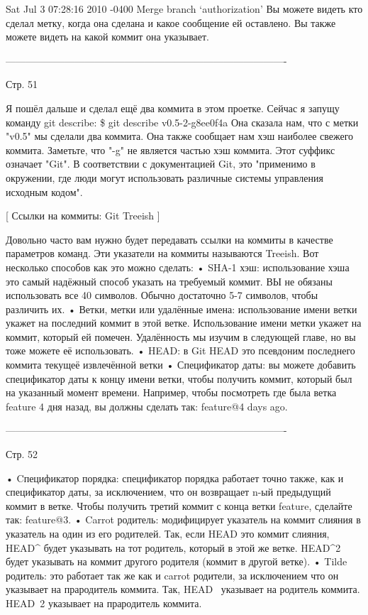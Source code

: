 Sat Jul 3 07:28:16 2010 -0400
Merge branch ‘authorization’
Вы можете видеть кто сделал метку, когда она сделана и какое сообщение ей оставлено.
Вы также можете видеть на какой коммит она указывает.

-------------------------------------------------------------------------------------

Стр. 51

Я пошёл дальше и сделал ещё два коммита в этом проетке. Сейчас я запущу команду
git describe:
\$ git describe
v0.5-2-g8ee0f4a
Она сказала нам, что с метки "v0.5" мы сделали два коммита. Она также сообщает
нам хэш наиболее свежего коммита. Заметьте, что "-g" не является частью хэш коммита.
Этот суффикс означает "Git". В соответствии с документацией Git, это "применимо в 
окружении, где люди могут использовать различные системы управления исходным кодом".

[ Ссылки на коммиты: Git Treeish ]

Довольно часто вам нужно будет передавать ссылки на коммиты в качестве параметров
команд. Эти указатели на коммиты называются Treeish.
Вот несколько способов как это можно сделать:
        • SHA-1 хэш: использование хэша это самый надёжный способ указать на требуемый
        коммит. ВЫ не обязаны использовать все 40 символов. Обычно достаточно 5-7
        символов, чтобы различить их.
        • Ветки, метки или удалённые имена: использование имени ветки укажет на 
        последний коммит в этой ветке. Использование имени метки укажет на коммит,
        который ей помечен. Удалённость мы изучим в следующей главе, но вы тоже 
        можете её использовать.
        • HEAD: в Git HEAD это псевдоним последнего коммита текущеё извлечённой 
        ветки
        • Спецификатор даты: вы можете добавить спецификатор даты к концу имени ветки,
        чтобы получить коммит, который был на указанный момент времени. Например,
        чтобы посмотреть где была ветка feature 4 дня назад, вы должны сделать так:
        feature@{4 days ago}.

-------------------------------------------------------------------------------------

Стр. 52

        • Cпецификатор порядка: спецификатор порядка работает точно также, как и 
        спецификатор даты, за исключением, что он возвращает n-ый предыдущий коммит
        в ветке. Чтобы получить третий коммит с конца ветки feature, сделайте так:
        feature@{3}.
        • Carrot родитель: модифицирует указатель на коммит слияния в указатель на
        один из его родителей. Так, если HEAD это коммит слияния, HEAD^ будет указывать
        на тот родитель, который в этой же ветке. HEAD^2 будет указывать на коммит 
        другого родителя (коммит в другой ветке).
        • Tilde родитель: это работает так же как и carrot родители, за исключением
        что он указывает на прародитель коммита. Так, HEAD~ указывает на родитель
        коммита. HEAD~2 указывает на прародитель коммита.

